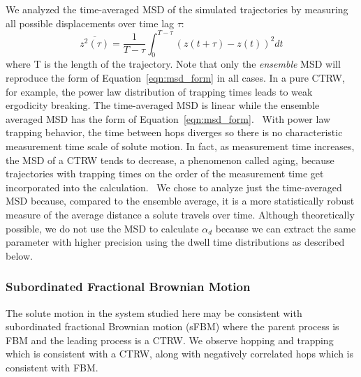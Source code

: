 \documentclass{article}
\begin{document}
  We analyzed the time-averaged MSD of the simulated trajectories by measuring
  all possible displacements over time lag $\tau$:
  \begin{equation}
  \overline{z^2(\tau)} = \dfrac{1}{T - \tau}\int_{0}^{T - \tau} (z(t + \tau) - z(t))^2 dt
  \end{equation}
  where T is the length of the trajectory. Note that only the \textit{ensemble} MSD
  will reproduce the form of Equation~\ref{eqn:msd_form} in all cases. 
  In a pure CTRW, for example, the power law distribution of trapping times leads to
  weak ergodicity breaking. The time-averaged MSD is linear while the ensemble averaged
  MSD has the form of Equation~\ref{eqn:msd_form}.~\cite{meroz_toolbox_2015} With power
  law trapping behavior, the time between hops diverges so there is no characteristic
  measurement time scale of solute motion. In fact, as measurement time increases, the 
  MSD of a CTRW tends to decrease, a phenomenon called aging, because trajectories 
  with trapping times on the order of the measurement time get incorporated into the 
  calculation.~\cite{bel_weak_2005} We chose to analyze just the time-averaged MSD 
  because, compared to the ensemble average, it is a more statistically robust measure
  of the average distance a solute travels over time. Although theoretically possible, we do
  not use the MSD to calculate $\alpha_d$ because we can extract the same parameter 
  with higher precision using the dwell time distributions as described below.
  
  
  \subsubsection*{Subordinated Fractional Brownian Motion}
  
  The solute motion in the system studied here may be consistent with 
  subordinated fractional Brownian motion (sFBM) where the parent process is FBM and 
  the leading process is a CTRW. We observe hopping and trapping which is consistent
  with a CTRW, along with negatively correlated hops which is consistent with FBM.  
\end{document}
